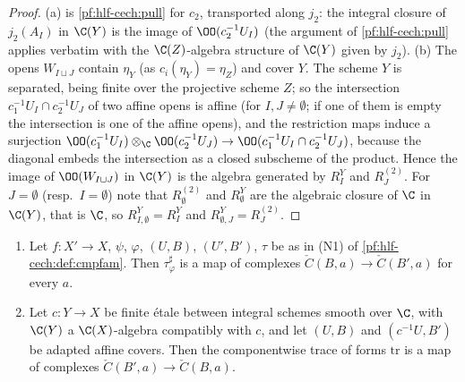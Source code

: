 \begin{proof}
(a) is \cref{pf:hlf-cech:pull} for $c_2$, transported along $j_2$: the integral closure of $j_2(A_I)$ in $\C(Y)$ is the image of $\OO(c_2^{-1}U_I)$
(the argument of \cref{pf:hlf-cech:pull} applies verbatim with the $\C(Z)$-algebra structure of $\C(Y)$ given by $j_2$).
(b) The opens $W_{I\sqcup J}$ contain $\eta_Y$ (as $c_i(\eta_Y)=\eta_Z$) and cover $Y$. The scheme $Y$ is separated, being finite over the projective
scheme $Z$; so the intersection $c_1^{-1}U_I\cap c_2^{-1}U_J$ of two affine opens is affine (for
$I,J\ne\emptyset$; if one of them is empty the intersection is one of the affine opens), and the restriction maps induce a surjection
$\OO(c_1^{-1}U_I)\otimes_\C\OO(c_2^{-1}U_J)\to\OO(c_1^{-1}U_I\cap c_2^{-1}U_J)$, because the diagonal embeds the intersection as a closed subscheme of
the product. Hence the image of $\OO(W_{I\sqcup J})$ in $\C(Y)$ is the algebra generated by $R^Y_I$ and $R^{(2)}_J$. For
$J=\emptyset$ (resp.\ $I=\emptyset$) note that $R^{(2)}_\emptyset$ and $R^Y_\emptyset$ are the algebraic closure of $\C$ in $\C(Y)$, that is
$\C$, so $R^Y_{I,\emptyset}=R^Y_I$ and $R^Y_{\emptyset,J}=R^{(2)}_J$.
\end{proof}

\begin{lemma}\label{pf:hlf-cech:cochainmaps}
\begin{enumerate}[label=(\alph*),nosep]
\item Let $f\colon X'\to X$, $\psi$, $\varphi$, $(U,B)$, $(U',B')$, $\tau$ be as in (N1) of \cref{pf:hlf-cech:def:cmpfam}. Then $\tau^\sharp_\varphi$ is a
  map of complexes $\check C(B,a)\to\check C(B',a)$ for every $a$.
\item Let $c\colon Y\to X$ be finite \'etale between integral schemes smooth over $\C$, with $\C(Y)$ a $\C(X)$-algebra compatibly with $c$, and let
  $(U,B)$ and $(c^{-1}U,B')$ be adapted affine covers. Then the componentwise trace of forms $\mathrm{tr}$ is a map of complexes
  $\check C(B',a)\to\check C(B,a)$.
\end{enumerate}
\end{lemma}

